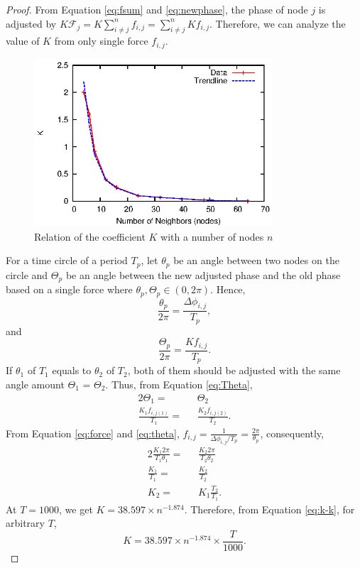 \begin{proof}
From Equation \ref{eq:fsum} and \ref{eq:newphase}, the phase of node $j$ is adjusted by $K\mathcal{F}_{j} = K\sum_{i \neq j}^n f_{i,j} = \sum_{i \neq j}^n K f_{i,j}$.
Therefore, we can analyze the value of $K$ from only single force $f_{i,j}$.

\begin{figure}[!t]
\centering
\includegraphics[width=3.5in]{figure/k-trendline}
\caption{Relation of the coefficient $K$ with a number of nodes $n$}
\label{fig:relation_k_n}
\end{figure}

For a time circle of a period $T_{p}$, let $\theta_{p}$ be an angle between two nodes on the circle and $\Theta_{p}$ be an angle between the new adjusted phase and the old phase based on a single force where $\theta_{p}, \Theta_{p} \in (0, 2\pi)$. %
Hence,
\begin{equation}
\frac{\theta_{p}}{2\pi}  = \frac{\Delta \phi_{i,j}}{T_p},
\label{eq:theta}
\end{equation}
and 
\begin{equation}
\frac{\Theta_{p}}{2\pi}  = \frac{Kf_{i,j}}{T_p}.
\label{eq:Theta}
\end{equation}
If $\theta_1$ of $T_1$ equals to $\theta_2$ of $T_2$, both of them should be adjusted with the same angle amount $\Theta_{1}$ = $\Theta_{2}$. 
Thus, from Equation \ref{eq:Theta},
\begin{alignat}{2}
\Theta_1 =&  \text{ } \Theta_2 \nonumber \\
\frac{K_{1} f_{i,j(1)}}{T_1} =& \text{ } \frac{K_{2} f_{i,j(2)}}{T_2}.  \nonumber
\end{alignat}
From Equation \ref{eq:force} and \ref{eq:theta}, $f_{i,j} = \frac{1}{\Delta \phi_{i,j} / T_{p}} = \frac{2\pi}{\theta_{p}}$, consequently,
\begin{alignat}{2}
\frac{K_{1}2\pi}{T_1\theta_1} =& \text{ } \frac{K_{2}2\pi}{T_2\theta_2}  \nonumber \\
\frac{K_{1}}{T_1} =& \text{ } \frac{K_{2}}{T_2}  \nonumber \\
K_2=& \text{ } K_{1} \frac{T_2}{T_1}.  \label{eq:k-k}
\end{alignat}
At $T = 1000$, we get $K = 38.597 \times n^{-1.874}$.
Therefore, from Equation \ref{eq:k-k}, for arbitrary $T$,
\begin{equation}
K = 38.597 \times n^{-1.874} \times \frac{T}{1000}. \nonumber
\end{equation}
\end{proof}


